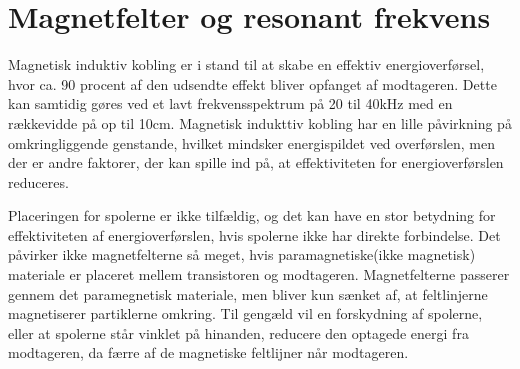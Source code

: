 \section{Magnetfelter og resonant frekvens}

Magnetisk induktiv kobling er i stand til at skabe en effektiv energioverførsel, hvor ca. 90 procent af den udsendte effekt bliver opfanget af modtageren. Dette kan samtidig gøres ved et lavt frekvensspektrum på 20 til 40kHz med en rækkevidde på op til 10cm. Magnetisk indukttiv kobling har en lille påvirkning på omkringliggende genstande, hvilket mindsker energispildet ved overførslen, men der er andre faktorer, der kan spille ind på, at effektiviteten for energioverførslen reduceres.

Placeringen for spolerne er ikke tilfældig, og det kan have en stor betydning for effektiviteten af energioverførslen, hvis spolerne ikke har direkte forbindelse. Det påvirker ikke magnetfelterne så meget, hvis paramagnetiske(ikke magnetisk) materiale er placeret mellem transistoren og modtageren. Magnetfelterne passerer gennem det paramegnetisk materiale, men bliver kun sænket af, at feltlinjerne magnetiserer partiklerne omkring. Til gengæld vil en forskydning af spolerne, eller at spolerne står vinklet på hinanden, reducere den optagede energi fra modtageren, da færre af de magnetiske feltlijner når modtageren.

